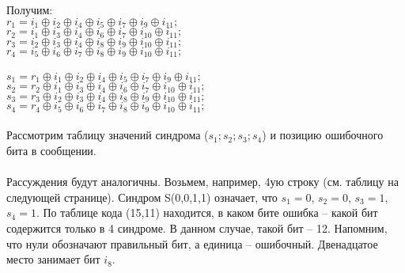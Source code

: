 Получим: 
\\$r_1 = i_1 \oplus i_2 \oplus i_4  \oplus i_5  \oplus i_7  \oplus i_9  \oplus i_{11};$ 
\\$r_2 = i_1 \oplus i_3 \oplus i_4  \oplus i_6  \oplus i_7  \oplus i_{10}  \oplus i_{11};$
\\$r_3 = i_2 \oplus i_3 \oplus i_4  \oplus i_8  \oplus i_9  \oplus i_{10}  \oplus i_{11};$
\\$r_4 = i_5 \oplus i_6 \oplus i_7  \oplus i_8  \oplus i_9  \oplus i_{10}  \oplus i_{11};$
\\
\\$s_1 = r_1 \oplus i_1 \oplus i_2 \oplus i_4  \oplus i_5  \oplus i_7  \oplus i_9  \oplus i_{11};$
\\$s_2 = r_2 \oplus i_1 \oplus i_3 \oplus i_4 \oplus i_6  \oplus i_7  \oplus i_{10}  \oplus i_{11};$
\\$s_3 = r_3 \oplus i_2 \oplus i_3 \oplus i_4 \oplus i_8  \oplus i_9  \oplus i_{10}  \oplus i_{11};$
\\$s_4 = r_4 \oplus i_5 \oplus i_6 \oplus i_7  \oplus i_8  \oplus i_9  \oplus i_{10}  \oplus i_{11};$
\\
\\Рассмотрим таблицу значений синдрома ($s_1;s_2;s_3;s_4$) и позицию ошибочного бита в сообщении. \\\\
Рассуждения будут аналогичны. Возьмем, например, 4ую строку (см. таблицу на следующей странице). Синдром S(0,0,1,1) означает, что $s_1 = 0$, $s_2 = 0$, $s_3 = 1$, $s_4 = 1$. По таблице кода (15,11) находится, в каком бите ошибка -- какой бит содержится только в 4 синдроме. В данном случае, такой бит -- 12. Напомним, что нули обозначают правильный бит, а единица -- ошибочный. Двенадцатое место занимает бит $i_8$.


